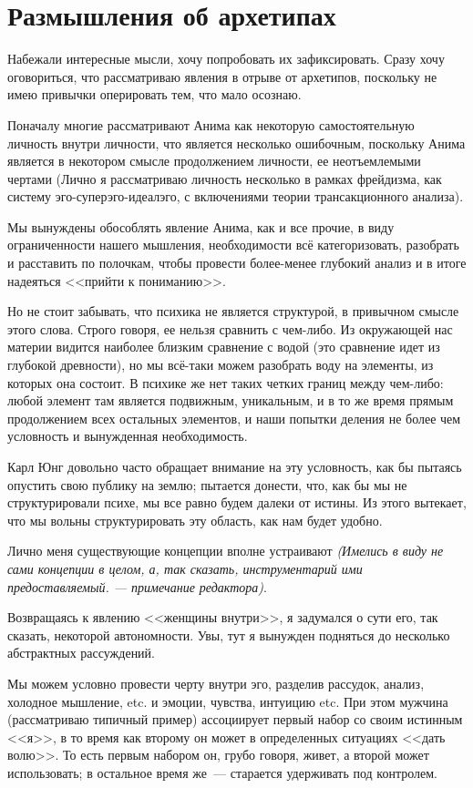 \documentclass[a4paper,14pt,oneside]{memoir}
\begin{document}
\section{Размышления об архетипах}
Набежали интересные мысли, хочу попробовать их зафиксировать. Сразу хочу оговориться, что рассматриваю явления в отрыве от архетипов, поскольку не имею привычки оперировать тем, что мало осознаю.

Поначалу многие рассматривают Анима как некоторую самостоятельную личность внутри личности, что является несколько ошибочным, поскольку Анима является в некотором смысле продолжением личности, ее неотъемлемыми чертами (Лично я рассматриваю личность несколько в рамках фрейдизма, как систему эго-суперэго-идеалэго, с включениями теории трансакционного анализа).

Мы вынуждены обособлять явление Анима, как и все прочие, в виду ограниченности нашего мышления, необходимости всё категоризовать, разобрать и расставить по полочкам, чтобы провести более-менее глубокий анализ и в итоге надеяться <<прийти к пониманию>>.

Но не стоит забывать, что психика не является структурой, в привычном смысле этого слова. Строго говоря, ее нельзя сравнить с чем-либо. Из окружающей нас материи видится наиболее близким сравнение с водой (это сравнение идет из глубокой древности), но мы всё-таки можем разобрать воду на элементы, из которых она состоит. В психике же нет таких четких границ между чем-либо: любой элемент там является подвижным, уникальным, и в то же время прямым продолжением всех остальных элементов, и наши попытки деления не более чем условность и вынужденная необходимость.

Карл Юнг довольно часто обращает внимание на эту условность, как бы пытаясь опустить свою публику на землю; пытается донести, что, как бы мы не структурировали психе, мы все равно будем далеки от истины. Из этого вытекает, что мы вольны структурировать эту область, как нам будет удобно.

Лично меня существующие концепции вполне устраивают \textit{(Имелись в виду не сами концепции в целом, а, так сказать, инструментарий ими предоставляемый. --- примечание редактора)}.

Возвращаясь к явлению <<женщины внутри>>, я задумался о сути его, так сказать, некоторой автономности. Увы, тут я вынужден подняться до несколько абстрактных рассуждений.

Мы можем условно провести черту внутри эго, разделив рассудок, анализ, холодное мышление, etc. и эмоции, чувства, интуицию etc. При этом мужчина (рассматриваю типичный пример) ассоциирует первый набор со своим истинным <<я>>, в то время как второму он может в определенных ситуациях <<дать волю>>. То есть первым набором он, грубо говоря, живет, а второй может использовать; в остальное время же~--- старается удерживать под контролем. 
\end{document}
